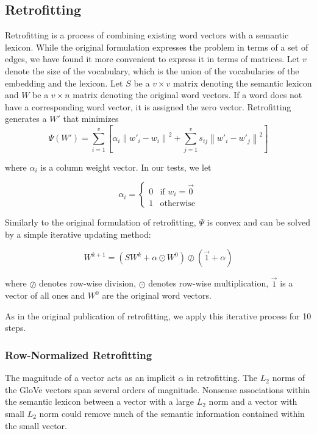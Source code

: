 \documentclass[letterpaper]{article}
\begin{document}
\subsection{Retrofitting}

Retrofitting \cite{faruqui2014retrofitting} is a process of combining existing
word vectors with a semantic lexicon. While the original formulation expresses
the problem in terms of a set of edges, we have found it more convenient to
express it in terms of matrices. Let $v$ denote the size of the vocabulary,
which is the union of the vocabularies of the embedding and the lexicon. Let $S$ be
a $v \times v$ matrix denoting the semantic lexicon and $W$ be a $v \times n$
matrix denoting the original word vectors. If a word does not have a
corresponding word vector, it is assigned the zero vector. Retrofitting
generates a $W'$ that minimizes
$$
\Psi \left( W' \right) = \sum_{i=1}^v \left[
  \alpha_i \left\|  w'_i - w_i \right\| ^ 2
  + \sum_{j=1}^v s_{ij} \left\| w'_i - w'_j \right\| ^ 2
\right]
$$

where $\alpha_i$ is a column weight vector. In our tests, we let

$$
\alpha_i =
  \begin{cases}
    0 & \text{if $w_i = \vec{0}$} \\
    1 & \text{otherwise}
  \end{cases}
$$

Similarly to the original formulation of retrofitting, $\Psi$ is convex and can
be solved by a simple iterative updating method:

$$
W^{k+1} = \left( S W^k + \alpha \odot W^0 \right)
\oslash \left( \vec{1} + \alpha \right)
$$

where $\oslash$ denotes row-wise division, $\odot$ denotes row-wise
multiplication, $\vec{1}$ is a vector of all ones and $W^0$ are the original
word vectors.

As in the original publication of retrofitting, we apply this iterative process
for 10 steps.

\subsubsection{Row-Normalized Retrofitting}

The magnitude of a vector acts as an implicit $\alpha$ in retrofitting.
The $L_2$ norms of the GloVe vectors span several orders of magnitude.
Nonsense associations within the semantic lexicon between a vector with a large
$L_2$ norm and a vector with small $L_2$ norm could remove much of the semantic
information contained within the small vector.
\end{document}
